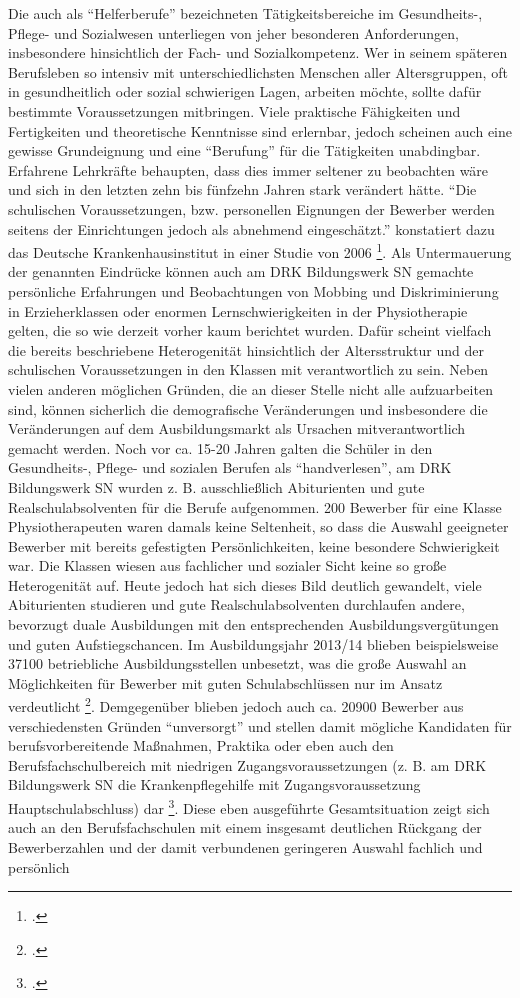 Die auch als "`Helferberufe"' bezeichneten Tätigkeitsbereiche im Gesundheits-, Pflege- und Sozialwesen unterliegen von jeher besonderen Anforderungen, insbesondere hinsichtlich der Fach- und Sozialkompetenz. Wer in seinem späteren Berufsleben so intensiv mit unterschiedlichsten Menschen aller Altersgruppen, oft in gesundheitlich oder sozial schwierigen Lagen, arbeiten möchte, sollte dafür bestimmte Voraussetzungen mitbringen. Viele praktische Fähigkeiten und Fertigkeiten und theoretische Kenntnisse sind erlernbar, jedoch scheinen auch eine gewisse Grundeignung und eine "`Berufung"' für die Tätigkeiten unabdingbar. Erfahrene Lehrkräfte behaupten, dass dies immer seltener zu beobachten wäre und sich in den letzten zehn bis fünfzehn Jahren stark verändert hätte. "`Die schulischen Voraussetzungen, bzw. personellen Eignungen der Bewerber werden seitens der Einrichtungen jedoch als abnehmend eingeschätzt."' konstatiert dazu das Deutsche Krankenhausinstitut in einer Studie von 2006 \footcite[8]{Krankenhausinstitut2006}. Als Untermauerung der genannten Eindrücke können auch am DRK Bildungswerk SN gemachte persönliche Erfahrungen und Beobachtungen von Mobbing und Diskriminierung in Erzieherklassen oder enormen Lernschwierigkeiten in der Physiotherapie gelten, die so wie derzeit vorher kaum berichtet wurden. Dafür scheint vielfach die bereits beschriebene Heterogenität hinsichtlich der Altersstruktur und der schulischen Voraussetzungen in den Klassen mit verantwortlich zu sein. Neben vielen anderen möglichen Gründen, die an dieser Stelle nicht alle aufzuarbeiten sind, können sicherlich die demografische Veränderungen und insbesondere die Veränderungen auf dem Ausbildungsmarkt als Ursachen mitverantwortlich gemacht werden. Noch vor ca. 15-20 Jahren galten die Schüler in den Gesundheits-, Pflege- und sozialen Berufen als "`handverlesen"', am DRK Bildungswerk SN wurden z. B. ausschließlich Abiturienten und gute Realschulabsolventen für die Berufe aufgenommen. 200 Bewerber für eine Klasse Physiotherapeuten waren damals keine Seltenheit, so dass die Auswahl geeigneter Bewerber mit bereits gefestigten Persönlichkeiten, keine besondere Schwierigkeit war. Die Klassen wiesen aus fachlicher und sozialer Sicht keine so große Heterogenität auf. Heute jedoch hat sich dieses Bild deutlich gewandelt, viele Abiturienten studieren und  gute Realschulabsolventen durchlaufen andere, bevorzugt duale Ausbildungen mit den entsprechenden Ausbildungsvergütungen und guten Aufstiegschancen. Im Ausbildungsjahr 2013/14 blieben beispielsweise 37100 betriebliche Ausbildungsstellen unbesetzt, was die große Auswahl an Möglichkeiten für Bewerber mit guten Schulabschlüssen nur im Ansatz verdeutlicht \footcite[vgl.][15]{BBF2015}. Demgegenüber blieben jedoch auch ca. 20900 Bewerber aus verschiedensten Gründen "`unversorgt"' und stellen damit mögliche Kandidaten für berufsvorbereitende Maßnahmen, Praktika oder eben auch den Berufsfachschulbereich mit niedrigen Zugangsvoraussetzungen (z. B. am DRK Bildungswerk SN die Krankenpflegehilfe mit Zugangsvoraussetzung Hauptschulabschluss) dar \footcite[vgl.][15]{BBF2015}. Diese eben ausgeführte Gesamtsituation zeigt sich auch an den Berufsfachschulen mit einem insgesamt deutlichen Rückgang der Bewerberzahlen und der damit verbundenen geringeren Auswahl fachlich und persönlich 